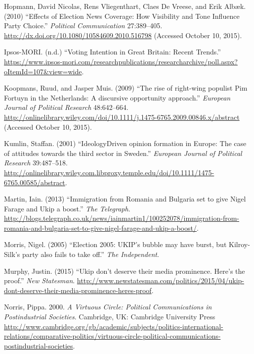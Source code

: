 \documentclass[12pt,article]{article}
\begin{document}
\hypertarget{ref-hopmannux5feffectsux5f2010}{}
Hopmann, David Nicolas, Rens Vliegenthart, Claes De Vreese, and Erik
Albæk. (2010) ``Effects of Election News Coverage: How Visibility and
Tone Influence Party Choice.'' \emph{Political Communication}
27:389--405. \url{http://dx.doi.org/10.1080/10584609.2010.516798}
(Accessed October 10, 2015).

\hypertarget{ref-IpsosMORI:gm2fXYNK}{}
Ipsos-MORI. (n.d.) ``Voting Intention in Great Britain: Recent Trends.''
\url{https://www.ipsos-mori.com/researchpublications/researcharchive/poll.aspx?oItemId=107\&view=wide}.

\hypertarget{ref-koopmansux5friseux5f2009}{}
Koopmans, Ruud, and Jasper Muis. (2009) ``The rise of right-wing
populist Pim Fortuyn in the Netherlands: A discursive opportunity
approach.'' \emph{European Journal of Political Research} 48:642--664.
\url{http://onlinelibrary.wiley.com/doi/10.1111/j.1475-6765.2009.00846.x/abstract}
(Accessed October 10, 2015).

\hypertarget{ref-Kumlin:2001iq}{}
Kumlin, Staffan. (2001) ``IdeologyDriven opinion formation in Europe:
The case of attitudes towards the third sector in Sweden.''
\emph{European Journal of Political Research} 39:487--518.
\url{http://onlinelibrary.wiley.com.libproxy.temple.edu/doi/10.1111/1475-6765.00585/abstract}.

\hypertarget{ref-martinux5fimmigrationux5f2013}{}
Martin, Iain. (2013) ``Immigration from Romania and Bulgaria set to give
Nigel Farage and Ukip a boost.'' \emph{The Telegraph}.
\url{http://blogs.telegraph.co.uk/news/iainmartin1/100252078/immigration-from-romania-and-bulgaria-set-to-give-nigel-farage-and-ukip-a-boost/}.

\hypertarget{ref-morrisux5felectionux5f2005}{}
Morris, Nigel. (2005) ``Election 2005: UKIP's bubble may have burst, but
Kilroy-Silk's party also fails to take off.'' \emph{The Independent}.

\hypertarget{ref-murphyux5fukipux5f2015}{}
Murphy, Justin. (2015) ``Ukip don't deserve their media prominence.
Here's the proof.'' \emph{New Statesman}.
\url{http://www.newstatesman.com/politics/2015/04/ukip-dont-deserve-their-media-prominence-heres-proof}.

\hypertarget{ref-norrisux5fvirtuousux5f2000}{}
Norris, Pippa. 2000. \emph{A Virtuous Circle: Political Communications
in Postindustrial Societies}. Cambridge, UK: Cambridge University Press
\url{http://www.cambridge.org/gb/academic/subjects/politics-international-relations/comparative-politics/virtuous-circle-political-communications-postindustrial-societies}.
\end{document}
